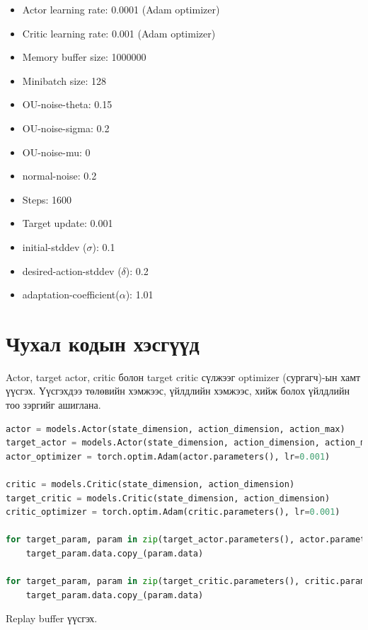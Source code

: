 \documentclass[12pt,A4]{report}
\begin{document}
\begin{itemize}
	\item Actor learning rate: 0.0001 (Adam optimizer)
	\item Critic learning rate: 0.001 (Adam optimizer)
	\item Memory buffer size: 1000000
	\item Minibatch size: 128
	\item OU-noise-theta: 0.15
	\item OU-noise-sigma: 0.2
	\item OU-noise-mu: 0
	\item normal-noise: 0.2
	\item Steps: 1600
	\item Target update: 0.001
	\item initial-stddev ($\sigma$): 0.1
	\item desired-action-stddev ($\delta$): 0.2
	\item adaptation-coefficient($\alpha$): 1.01
\end{itemize}

\section{Чухал кодын хэсгүүд}

Actor, target actor, critic болон target critic сүлжээг optimizer (сургагч)-ын хамт үүсгэх. Үүсгэхдээ төлөвийн хэмжээс, үйлдлийн хэмжээс, хийж болох үйлдлийн тоо зэргийг ашиглана.

\begin{lstlisting}[language=Python, caption=Actor critic сүлжээ үүсгэх, frame=single]
actor = models.Actor(state_dimension, action_dimension, action_max)
target_actor = models.Actor(state_dimension, action_dimension, action_max)
actor_optimizer = torch.optim.Adam(actor.parameters(), lr=0.001)

critic = models.Critic(state_dimension, action_dimension)
target_critic = models.Critic(state_dimension, action_dimension)
critic_optimizer = torch.optim.Adam(critic.parameters(), lr=0.001)

for target_param, param in zip(target_actor.parameters(), actor.parameters()):
	target_param.data.copy_(param.data)

for target_param, param in zip(target_critic.parameters(), critic.parameters()):
    target_param.data.copy_(param.data)
\end{lstlisting}

Replay buffer үүсгэх.
\end{document}
